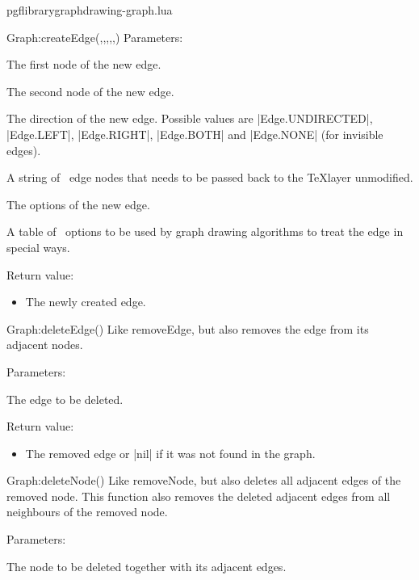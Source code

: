 \begin{filedescription}{pgflibrarygraphdrawing-graph.lua}
\begin{luacommand}{{Graph:createEdge}(,,,,,)}
Parameters:
\begin{parameterdescription}
	\item[\meta{nodeA}] The first node of the new edge.\item[\meta{nodeB}] The second node of the new edge.\item[\meta{direction}] The direction of the new edge. Possible values are |Edge.UNDIRECTED|, |Edge.LEFT|, |Edge.RIGHT|, |Edge.BOTH| and |Edge.NONE| (for invisible edges).\item[\meta{edgenodes}] A string of \tikzname\ edge nodes that needs to be passed back to the \TeX layer unmodified.\item[\meta{options}] The options of the new edge.\item[\meta{tikzoptions}] A table of \tikzname\ options to be used by graph drawing algorithms to treat the edge in special ways. 
\end{parameterdescription}


Return value:
\begin{itemize} \item[] The newly created edge.  \end{itemize}


\end{luacommand}\begin{luacommand}{{Graph:deleteEdge}()}
Like removeEdge, but also removes the edge from its adjacent nodes. 

Parameters:
\begin{parameterdescription}
	\item[\meta{edge}] The edge to be deleted. 
\end{parameterdescription}


Return value:
\begin{itemize} \item[] The removed edge or |nil| if it was not found in the graph.  \end{itemize}


\end{luacommand}\begin{luacommand}{{Graph:deleteNode}()}
Like removeNode, but also deletes all adjacent edges of the removed node.  This function also removes the deleted adjacent edges from all neighbours of the removed node. 

Parameters:
\begin{parameterdescription}
	\item[\meta{node}] The node to be deleted together with its adjacent edges. 
\end{parameterdescription}



\end{luacommand}
\end{filedescription}
